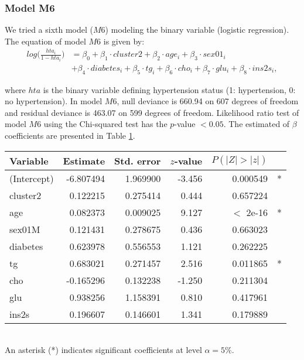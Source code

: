\subsubsection{Model M6}
We tried a sixth model ($M6$) modeling the binary variable (logistic regression). The equation of model $M6$ is given by:
\begin{align*}
log \Bigg (\frac{hta_i}{1-hta_i} \Bigg ) &= \beta_0 + \beta_1 \cdot cluster2 + \beta_2 \cdot age_i + \beta_3 \cdot sex01_i  \\
& +\beta_4 \cdot diabetes_i +\beta_5 \cdot tg_i +\beta_6 \cdot cho_i +\beta_7 \cdot glu_i +\beta_8 \cdot ins2s_i,
\end{align*}

where $hta$ is the binary variable defining hypertension status (1: hypertension, 0: no hypertension). In model $M6$, null deviance is 660.94 on 607 degrees of freedom and residual deviance is 463.07 on 599 degrees of freedom. Likelihood ratio test of model $M6$ using the Chi-squared test has the $p$-value $<0.05$. The estimated of $\beta$ coefficients are presented in Table \ref{table:betasm6}.

\begin{table}
\centering
{}
\begin{tabular}{lrrrrl}
\toprule
Variable & Estimate & Std. error & $z$-value & $P(|Z|>|z|)$ &\\
\midrule
(Intercept)& -6.807494 &  1.969900 & -3.456 &0.000549 &* \\
cluster2 &    0.122215 &  0.275414 &  0.444& 0.657224    & \\
age       &   0.082373  & 0.009025 & 9.127  & $<$ 2e-16 &* \\
sex01M    &   0.121431 &  0.278675 &  0.436& 0.663023  &   \\
diabetes   &  0.623978 &  0.556553  & 1.121 &0.262225  &   \\
tg          & 0.683021&   0.271457  & 2.516& 0.011865 &*   \\
cho       &-0.165296&  0.132238 & -1.250& 0.211304  &   \\
glu        &  0.938256   &1.158391 &  0.810& 0.417961  &   \\
ins2s       & 0.196607 &  0.146601&  1.341& 0.179889 & \\
\bottomrule
\end{tabular}
\label{table:betasm6} \\
{\footnotesize An asterisk (*) indicates significant coefficients at level $\alpha=5\%$.}
\end{table}

